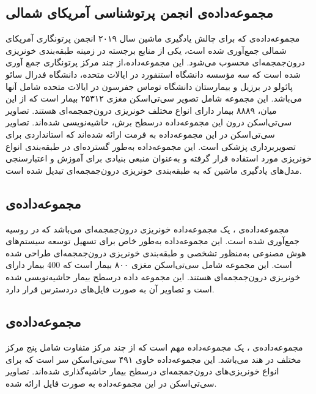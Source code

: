  \subsection{مجموعه‌داده‌ی انجمن پرتوشناسی آمریکای شمالی
  }
 مجموعه‌داده‌ی 
 \cite{rsna_hemorrhage_detection_kaggle,rsna_kaggle}
  که برای چالش یادگیری ماشین سال ۲۰۱۹ انجمن پرتونگاری آمریکای شمالی جمع‌آوری شده است، یکی از منابع برجسته در زمینه طبقه‌بندی خونریزی درون‌جمجمه‌ای محسوب می‌شود. این مجموعه‌داده،از چند مرکز پرتونگاری جمع آوری شده است که سه مؤسسه دانشگاه استنفورد در ایالات متحده، دانشگاه فدرال سائو پائولو در برزیل و بیمارستان دانشگاه توماس جفرسون در ایالات متحده شامل آنها می‌باشد. این مجموعه شامل تصویر سی‌تی‌اسکن مغزی ۲۵۳۱۲ بیمار است که از این میان، ۸۸۸۹ بیمار دارای انواع مختلف خونریزی درون‌جمجمه‌ای هستند. تصاویر سی‌تی‌اسکن درون این مجموعه‌داده درسطح برش،‌ حاشیه‌نویسی 
 شده‌اند.  تصاویر سی‌تی‌اسکن در این مجموعه‌داده به فرمت
   ارائه شده‌اند که استانداردی برای تصویربرداری پزشکی است. این مجموعه‌داده به‌طور گسترده‌ای در طبقه‌بندی انواع خونریزی مورد استفاده قرار گرفته و به‌عنوان منبعی بنیادی برای آموزش و اعتبارسنجی مدل‌های یادگیری ماشین که به طبقه‌بندی خونریزی درون‌جمجمه‌ای تبدیل شده است.
 
 \subsection{مجموعه‌داده‌ی }
 مجموعه‌داده‌ی
  \cite{medmos_khoruzhaya2024expanded}،
  یک مجموعه‌داده خونریزی درون‌جمجمه‌ای می‌باشد که در روسیه جمع‌آوری شده است. این مجموعه‌داده به‌طور خاص برای تسهیل توسعه سیستم‌های هوش مصنوعی به‌منظور تشخصی و طبقه‌بندی خونریزی درون‌جمجمه‌ای طراحی شده است. این مجموعه شامل سی‌تی‌اسکن مغزی ۸۰۰ بیمار است که 400 بیمار دارای خونریزی درون‌جمجمه‌ای هستند. این مجموعه داده درسطح بیمار حاشیه‌نویسی شده است و تصاویر آن به صورت فایل‌های 
  دردسترس قرار دارد.
 
 \subsection{مجموعه‌داده‌ی }
 مجموعه‌داده‌ی
  \cite{cq500_chilamkurthy2018development}
  ، یک مجموعه‌داده مهم است که از چند مرکز متفاوت شامل پنج مرکز مختلف در هند می‌باشد. این مجموعه‌داده خاوی ۴۹۱ سی‌تی‌اسکن سر است که برای انواع خونریزی‌های درون‌جمجمه‌ای درسطح بیمار حاشیه‌گذاری شده‌اند. تصاویر سی‌تی‌اسکن در این مجموعه‌داده به صورت فایل
    ارائه شده.
